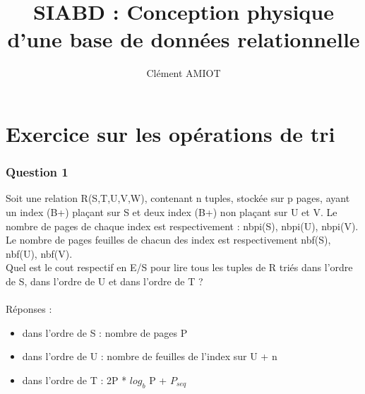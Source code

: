 \documentclass[11pt]{article}
\title{SIABD : Conception physique d'une base de données relationnelle}
\author{Clément AMIOT}
\begin{document}
\maketitle
\newpage
\tableofcontents
\newpage
\part{Exercice sur les opérations de tri}
\section{Question 1}
Soit une relation R(S,T,U,V,W), contenant n tuples, stockée sur p pages, ayant un index (B+) plaçant sur S et deux index (B+) non plaçant sur U et V. Le nombre de pages de chaque index est respectivement : nbpi(S), nbpi(U), nbpi(V). Le nombre de pages feuilles de chacun des index est respectivement nbf(S), nbf(U), nbf(V).
\\Quel est le cout respectif en E/S pour lire tous les tuples de R triés dans l'ordre de S, dans l'ordre de U et dans l'ordre de T ?
\\\\Réponses :
\begin{itemize}
\item dans l'ordre de S : nombre de pages P
\item dans l'ordre de U : nombre de feuilles de l'index sur U + n
\item dans l'ordre de T : 2P * $log_b$ P + $P_{seq}$
\end{itemize}
\end{document}
